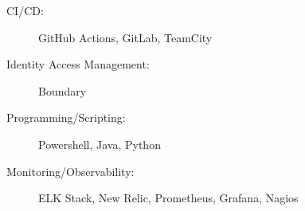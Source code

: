 \begin{minipage}[t]{.5\linewidth}
  \begin{description}
    \item[CI/CD:] GitHub Actions, GitLab, TeamCity
  \end{description}
\end{minipage}%
\hfil
\begin{minipage}[t]{.5\linewidth}
  \begin{description}
    \item[Identity Access Management:] Boundary
  \end{description}
\end{minipage}

\begin{minipage}[t]{.8\linewidth}
  \begin{description}
    \item[Programming/Scripting:] Powershell, Java, Python
  \end{description}
\end{minipage}

\begin{minipage}[t]{.8\linewidth}
  \begin{description}
    \item[Monitoring/Observability:] ELK Stack, New Relic, Prometheus, Grafana, Nagios
  \end{description}
\end{minipage}
